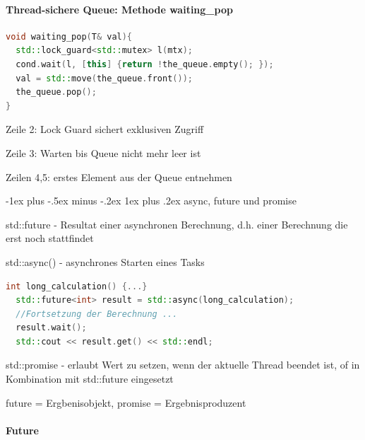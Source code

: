 \documentclass[10pt]{article}
\makeatletter
\renewcommand{\subsubsection}{\@startsection{subsubsection}{3}{0mm}%
                                {-1ex plus -.5ex minus -.2ex}%
                                {1ex plus .2ex}%
                                {\normalfont\small\bfseries}}
\makeatother
\begin{document}
\paragraph{Thread-sichere Queue: Methode waiting\_pop}
\begin{lstlisting}[language=C++]
void waiting_pop(T& val){
  std::lock_guard<std::mutex> l(mtx);
  cond.wait(l, [this] {return !the_queue.empty(); });
  val = std::move(the_queue.front());
  the_queue.pop();
}
\end{lstlisting}
\begin{itemize*}
  \item Zeile 2: Lock Guard sichert exklusiven Zugriff
  \item Zeile 3: Warten bis Queue nicht mehr leer ist
  \item Zeilen 4,5: erstes Element aus der Queue entnehmen
\end{itemize*}

\subsubsection{async, future und promise}
\begin{itemize*}
  \item std::future - Resultat einer asynchronen Berechnung, d.h. einer Berechnung die erst noch stattfindet
  \item std::async() - asynchrones Starten eines Tasks
  \begin{lstlisting}[language=C++]
  int long_calculation() {...}
  std::future<int> result = std::async(long_calculation);
  //Fortsetzung der Berechnung ...
  result.wait();
  std::cout << result.get() << std::endl;
  \end{lstlisting}
  \item std::promise - erlaubt Wert zu setzen, wenn der aktuelle Thread beendet ist, of in Kombination mit std::future eingesetzt
  \item future = Ergbenisobjekt, promise = Ergebnisproduzent
\end{itemize*}

\paragraph{Future}
\end{document}
